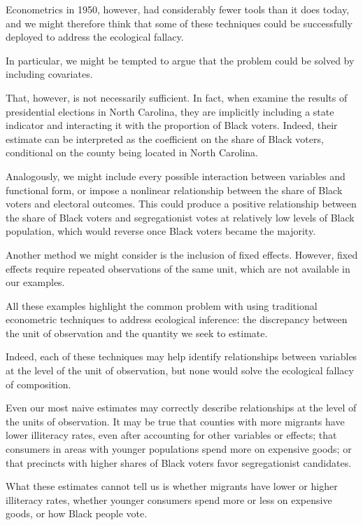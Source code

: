 Econometrics in 1950, however, had considerably fewer tools than it does today, and we might therefore think that some of these techniques could be successfully deployed to address the ecological fallacy.

In particular, we might be tempted to argue that the problem could be solved by including covariates.

That, however, is not necessarily sufficient.
In fact, when \citet{kuriwaki2026roleconfounderslinearityecological} examine the results of presidential elections in North Carolina, they are implicitly including a state indicator and interacting it with the proportion of Black voters.
Indeed, their estimate can be interpreted as the coefficient on the share of Black voters, conditional on the county being located in North Carolina.

Analogously, we might include every possible interaction between variables and functional form, or impose a nonlinear relationship between the share of Black voters and electoral outcomes. This could produce a positive relationship between the share of Black voters and segregationist votes at relatively low levels of Black population, which would reverse once Black voters became the majority.

Another method we might consider is the inclusion of fixed effects.
However, fixed effects require repeated observations of the same unit, which are not available in our examples.

All these examples highlight the common problem with using traditional econometric techniques to address ecological inference: the discrepancy between the unit of observation and the quantity we seek to estimate.

Indeed, each of these techniques may help identify relationships between variables at the level of the unit of observation, but none would solve the ecological fallacy of composition.

Even our most naive estimates may correctly describe relationships at the level of the units of observation.
It may be true that counties with more migrants have lower illiteracy rates, even after accounting for other variables or effects; that consumers in areas with younger populations spend more on expensive goods; or that precincts with higher shares of Black voters favor segregationist candidates.

What these estimates cannot tell us is whether migrants have lower or higher illiteracy rates, whether younger consumers spend more or less on expensive goods, or how Black people vote.

